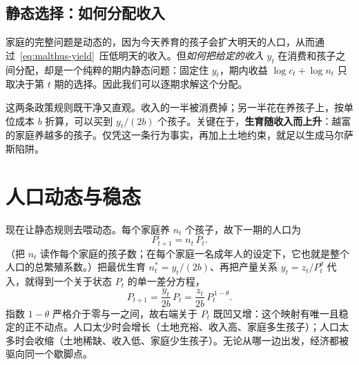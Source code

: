\subsection{静态选择：如何分配收入}

家庭的完整问题是动态的，因为今天养育的孩子会扩大明天的人口，从而通过~\eqref{eq:malthus-yield}~压低明天的收入。但\emph{如何把给定的收入} $y_t$ 在消费和孩子之间分配，却是一个纯粹的期内静态问题：固定住 $y_t$，期内收益 $\log c_t + \log n_t$ 只取决于第 $t$ 期的选择。因此我们可以逐期求解这个分配。



这两条政策规则既干净又直观。收入的一半被消费掉；另一半花在养孩子上，按单位成本 $b$ 折算，可以买到 $y_t/(2b)$ 个孩子。关键在于，\textbf{生育随收入而上升}：越富的家庭养越多的孩子。仅凭这一条行为事实，再加上土地约束，就足以生成马尔萨斯陷阱。

\section{人口动态与稳态}

现在让静态规则去喂动态。每个家庭养 $n_t$ 个孩子，故下一期的人口为
\begin{equation}
P_{t+1} = n_t\, P_t.
\label{eq:malthus-lom}
\end{equation}
（把 $n_t$ 读作每个家庭的孩子数；在每个家庭一名成年人的设定下，它也就是整个人口的总繁殖系数。）把最优生育 $n_t^{*} = y_t/(2b)$、再把产量关系 $y_t = z_t / P_t^{\theta}$ 代入，就得到一个关于状态 $P_t$ 的单一差分方程，
\begin{equation}
P_{t+1} = \frac{y_t}{2b}\, P_t = \frac{z_t}{2b}\, P_t^{\,1-\theta}.
\label{eq:malthus-pdyn}
\end{equation}
指数 $1-\theta$ 严格介于零与一之间，故右端关于 $P_t$ 既凹又增：这个映射有唯一且稳定的正不动点。人口太少时会增长（土地充裕、收入高、家庭多生孩子）；人口太多时会收缩（土地稀缺、收入低、家庭少生孩子）。无论从哪一边出发，经济都被驱向同一个歇脚点。

